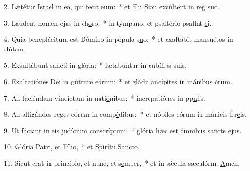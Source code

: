 2. Lætétur Israël in eo, qui fecit \uline{e}um:~* et fílii Sion exsúltent in reg s\uline{u}o.\par 
3. Laudent nomen ejus in ch\uline{o}ro:~* in týmpano, et psaltério psallnt \uline{e}i.\par 
4. Quia beneplácitum est Dómino in pópulo s\uline{u}o:~* et exaltábit mansuétos in sl\uline{ú}tem.\par 
5. Exsultábunt sancti in gl\uline{ó}ria:~* lætabúntur in cubílibs s\uline{u}is.\par 
6. Exaltatiónes Dei in gútture e\uline{ó}rum:~* et gládii ancípites in mánibus \uline{ó}rum.\par 
7. Ad faciéndam vindíctam in nati\uline{ó}nibus:~* increpatiónes in pp\uline{u}lis.\par 
8. Ad alligándos reges eórum in comp\uline{é}dibus:~* et nóbiles eórum in mánicis frr\uline{e}is.\par 
9. Ut fáciant in eis judícium conscr\uline{í}ptum:~* glória hæc est ómnibus sancts \uline{e}jus.\par 
10. Glória Patri, et F\uline{í}lio,~* et Spirítu S\uline{a}ncto.\par 
11. Sicut erat in princípio, et nunc, et s\uline{e}mper,~* et in sǽcula sæculórm. \uline{A}men.\par 
